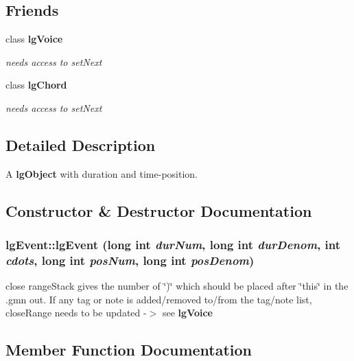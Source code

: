 \subsection*{Friends}
\begin{CompactItemize}
\item 
class {\bf lg\-Voice}
\begin{CompactList}\small\item\em needs access to set\-Next \item\end{CompactList}\item 
class {\bf lg\-Chord}
\begin{CompactList}\small\item\em needs access to set\-Next \item\end{CompactList}\end{CompactItemize}


\subsection{Detailed Description}
A {\bf lg\-Object} with duration and time-position. 



\subsection{Constructor \& Destructor Documentation}
\subsubsection{\setlength{\rightskip}{0pt plus 5cm}lg\-Event::lg\-Event (long int {\em dur\-Num}, long int {\em dur\-Denom}, int {\em cdots}, long int {\em pos\-Num}, long int {\em pos\-Denom})}\label{classlgEvent_a0}


close range\-Stack gives the number of \char`\"{})\char`\"{} which should be placed after \char`\"{}this\char`\"{} in the .gmn out. If any tag or note is added/removed to/from the tag/note list, close\-Range needs to be updated -$>$ see {\bf lg\-Voice} 

\subsection{Member Function Documentation}
